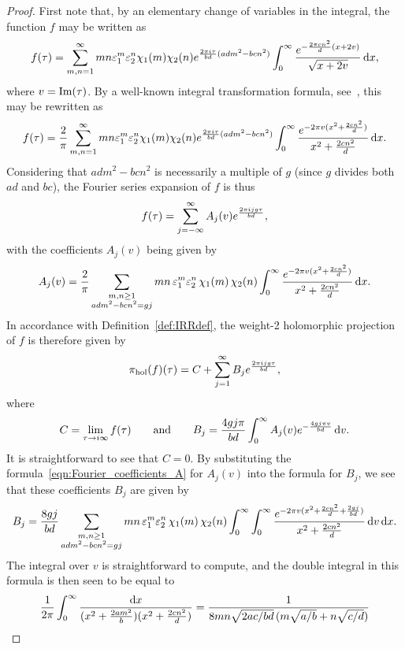 \documentclass[11pt,reqno]{amsart}
\newcommand{\im}{\textnormal{Im}}
\renewcommand{\=}{\;=\;}
\renewcommand{\Im}{\im}
\theoremstyle{myremark}
\newcommand{\dd}{\mathrm{d}}
\begin{document}
\begin{proof} 
First note that, by an elementary change of variables in the integral, the function $f$ may be written as
\[ 
f(\tau) = \sum_{m,n=1}^\infty mn \varepsilon_1^m \varepsilon_2^n\chi_1(m) \chi_2(n) e^{{2\pi i \tau \over bd}(adm^2-bcn^2)} \int_0^\infty {e^{-{2\pi c n^2 \over d} (x+2v)} \over \sqrt{x+2v}} \, \dd x, 
\]
where $v = \Im(\tau)$. 
By a well-known integral transformation formula, see~\cite[Section~1]{Yzeren1979}, this may be rewritten as
\[ 
f(\tau) = {2 \over \pi} \sum_{m,n=1}^\infty mn \varepsilon_1^m \varepsilon_2^n \chi_1(m) \chi_2(n) e^{{2\pi i \tau \over bd}(adm^2-bcn^2)} \int_0^\infty {e^{-2\pi v(x^2+{2cn^2 \over d})} \over x^2+{2cn^2 \over d}} \, \dd x. 
\]
Considering that $adm^2-bcn^2$ is necessarily a multiple of $g$ (since $g$ divides both $ad$ and $bc$), the Fourier series expansion of $f$ is thus
\[ 
f(\tau) = \sum_{j=-\infty}^\infty A_j(v) e^{2\pi ijg\tau \over bd}, 
\]
with the coefficients $A_j(v)$ being given by
\begin{equation} \label{eqn:Fourier_coefficients_A}
A_j(v) = {2 \over \pi} \sum_{\substack{m,n \geq 1 \\ adm^2-bcn^2 = gj}} mn \,\varepsilon_1^m \varepsilon_2^n \,\chi_1(m)\, \chi_2(n) \int_0^\infty {e^{-2\pi v(x^2+{2cn^2 \over d})} \over x^2+{2cn^2 \over d}} \, \dd x.
\end{equation}
In accordance with Definition~\ref{def:IRRdef}, the weight-2 holomorphic projection of $f$ is therefore given by
\begin{equation} \label{eqn:initial_hol_proj}
\pi_\text{hol}(f)(\tau) = C + \sum_{j=1}^\infty B_j e^{2\pi ijg\tau \over bd},
\end{equation}
where
\[ 
C = \lim_{\tau \rightarrow i\infty} f(\tau) \qquad \text{and} \qquad B_j = {4gj\pi \over bd} \int_0^\infty A_j(v) e^{-{4gj\pi v \over bd}} \, \dd v. 
\]
It is straightforward to see that $C=0$. 
By substituting the formula~\eqref{eqn:Fourier_coefficients_A} for $A_j(v)$ into the formula for $B_j$, we see that these coefficients $B_j$ are given by
\[ 
B_j = {8gj \over bd} \sum_{\substack{m,n \geq 1 \\ adm^2-bcn^2 = gj}} mn \,\varepsilon_1^m \varepsilon_2^n \,\chi_1(m)\, \chi_2(n) \int_0^\infty \int_0^\infty {e^{-2\pi v(x^2+{2cn^2 \over d}+{2gj \over bd})} \over x^2+{2cn^2 \over d}} \, \dd v \, \dd x. 
\]
The integral over $v$ is straightforward to compute, and the double integral in this formula is then seen to be equal to
\begin{align*}
{1 \over 2\pi}\int_0^\infty {\dd x \over (x^2+{2am^2 \over b})(x^2+{2cn^2 \over d})} &= {1 \over 8mn\sqrt{2ac/bd}\, (m\sqrt{a/b}+n\sqrt{c/d})} \\

\end{align*}
\end{proof}
\end{document}
